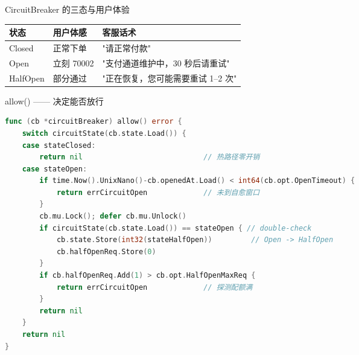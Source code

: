 \documentclass[aspectratio=169,11pt]{beamer}
\begin{document}
\begin{frame}[shrink]{CircuitBreaker 的三态与用户体验}
\vspace{1mm}
\begin{tabular}{@{}lll@{}}
\toprule
状态     & 用户体感         & 客服话术       \\
\midrule
Closed   & 正常下单         & "请正常付款" \\
Open     & 立刻 70002       & "支付通道维护中，30 秒后请重试" \\
HalfOpen & 部分通过         & "正在恢复，您可能需要重试 1--2 次" \\
\bottomrule
\end{tabular}
\end{frame}

\begin{frame}{allow() —— 决定能否放行}
\begin{lstlisting}[language=Go,firstnumber=76,
  caption={}]
func (cb *circuitBreaker) allow() error {
    switch circuitState(cb.state.Load()) {
    case stateClosed:
        return nil                            // 热路径零开销
    case stateOpen:
        if time.Now().UnixNano()-cb.openedAt.Load() < int64(cb.opt.OpenTimeout) {
            return errCircuitOpen             // 未到自愈窗口
        }
        cb.mu.Lock(); defer cb.mu.Unlock()
        if circuitState(cb.state.Load()) == stateOpen { // double-check
            cb.state.Store(int32(stateHalfOpen))         // Open -> HalfOpen
            cb.halfOpenReq.Store(0)
        }
        if cb.halfOpenReq.Add(1) > cb.opt.HalfOpenMaxReq {
            return errCircuitOpen             // 探测配额满
        }
        return nil
    }
    return nil
}
\end{lstlisting}
\end{frame}
\end{document}
